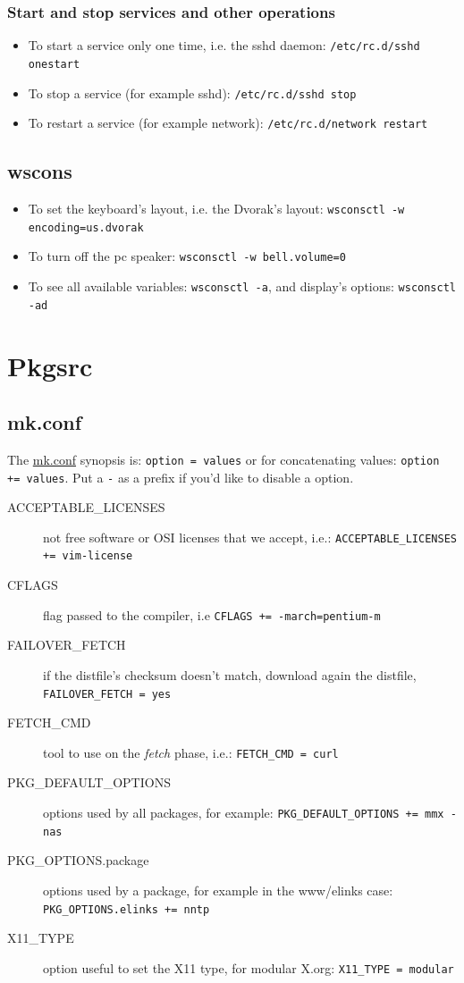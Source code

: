\documentclass[notumble]{leaflet}
\begin{document}
\subsubsection{Start and stop services and other operations}
\begin{itemize}
\item To start a service only one time, i.e. the \mbox{sshd} daemon: 
\verb|/etc/rc.d/sshd onestart|
\item To stop a service (for example \mbox{sshd}): 
\verb|/etc/rc.d/sshd stop|
\item To restart a service (for example \mbox{network}): 
\verb|/etc/rc.d/network restart|
\end{itemize}

\subsection{wscons}
\begin{itemize}
\item To set the keyboard's layout, i.e. the Dvorak's layout: 
\verb|wsconsctl -w encoding=us.dvorak|
\item To turn off the pc speaker: \verb|wsconsctl -w bell.volume=0|
\item To see all available variables: \verb|wsconsctl -a|,
and display's options: \verb|wsconsctl -ad|
\end{itemize}


\section{Pkgsrc}
\subsection{mk.conf}
The \url{mk.conf} synopsis is: \verb|option = values| or for concatenating
values:
\verb|option += values|. Put a \verb|-| as a prefix if you'd like to disable a
option.

\begin{description}
\item[ACCEPTABLE\_LICENSES] not free software or OSI licenses that we accept,
i.e.:
\verb|ACCEPTABLE_LICENSES += vim-license|
\item[CFLAGS] flag passed to the compiler, i.e
\verb|CFLAGS += -march=pentium-m|
\item[FAILOVER\_FETCH] if the distfile's checksum doesn't match, download
again the distfile, \verb|FAILOVER_FETCH = yes|
\item[FETCH\_CMD] tool to use on the \emph{fetch} phase, i.e.:
\verb|FETCH_CMD = curl|
\item[PKG\_DEFAULT\_OPTIONS] options used by all packages, for example:
\verb|PKG_DEFAULT_OPTIONS += mmx -nas|
\item[PKG\_OPTIONS.package] options used by a package, for example in the
\mbox{www/elinks} case: \verb|PKG_OPTIONS.elinks += nntp|
\item[X11\_TYPE] option useful to set the X11 type, for modular \mbox{X.org}:
\verb|X11_TYPE = modular|
\end{description}
\end{document}
